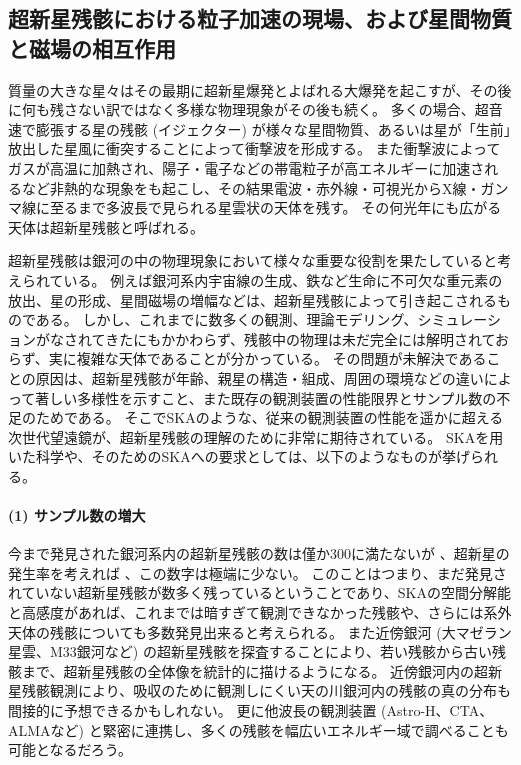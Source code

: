 \subsection{超新星残骸における粒子加速の現場、および星間物質と磁場の相互作用} \label{transients.s3.snr}

質量の大きな星々はその最期に超新星爆発とよばれる大爆発を起こすが、その後に何も残さない訳ではなく多様な物理現象がその後も続く。
多くの場合、超音速で膨張する星の残骸 (イジェクター) が様々な星間物質、あるいは星が「生前」放出した星風に衝突することによって衝撃波を形成する。
また衝撃波によってガスが高温に加熱され、陽子・電子などの帯電粒子が高エネルギーに加速されるなど非熱的な現象をも起こし、その結果電波・赤外線・可視光からX線・ガンマ線に至るまで多波長で見られる星雲状の天体を残す。
その何光年にも広がる天体は超新星残骸と呼ばれる。

超新星残骸は銀河の中の物理現象において様々な重要な役割を果たしていると考えられている。
例えば銀河系内宇宙線の生成、鉄など生命に不可欠な重元素の放出、星の形成、星間磁場の増幅などは、超新星残骸によって引き起こされるものである。
しかし、これまでに数多くの観測、理論モデリング、シミュレーションがなされてきたにもかかわらず、残骸中の物理は未だ完全には解明されておらず、実に複雑な天体であることが分かっている。
その問題が未解決であることの原因は、超新星残骸が年齢、親星の構造・組成、周囲の環境などの違いによって著しい多様性を示すこと、また既存の観測装置の性能限界とサンプル数の不足のためである。
そこでSKAのような、従来の観測装置の性能を遥かに超える次世代望遠鏡が、超新星残骸の理解のために非常に期待されている。
SKAを用いた科学や、そのためのSKAへの要求としては、以下のようなものが挙げられる。

\paragraph{(1) サンプル数の増大}
今まで発見された銀河系内の超新星残骸の数は僅か300に満たないが \citep{2014BASI...42...47G}、超新星の発生率を考えれば \cite[e.g.,][]{2006Natur.439...45D}、この数字は極端に少ない。
このことはつまり、まだ発見されていない超新星残骸が数多く残っているということであり、SKAの空間分解能と高感度があれば、これまでは暗すぎて観測できなかった残骸や、さらには系外天体の残骸についても多数発見出来ると考えられる。
また近傍銀河 (大マゼラン星雲、M33銀河など) の超新星残骸を探査することにより、若い残骸から古い残骸まで、超新星残骸の全体像を統計的に描けるようになる。
近傍銀河内の超新星残骸観測により、吸収のために観測しにくい天の川銀河内の残骸の真の分布も間接的に予想できるかもしれない。
更に他波長の観測装置 (Astro-H、CTA、ALMAなど) と緊密に連携し、多くの残骸を幅広いエネルギー域で調べることも可能となるだろう。


